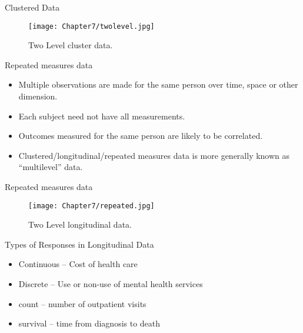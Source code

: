 \documentclass{beamer}
\begin{document}
\begin{frame}{Clustered Data}
\begin{figure}[h!]
\centering
\texttt{[image: Chapter7/twolevel.jpg]}
\caption{Two Level cluster data. \label{twolevel}}
\end{figure}
\end{frame}

\begin{frame}{Repeated measures data}
\begin{itemize}
	\item Multiple observations are made for the same person over time, space or other dimension. \vspace{0.25cm}
	\item Each subject need not have all measurements. \vspace{0.25cm}
	\item Outcomes measured for the same person are likely to be correlated. \vspace{0.25cm}
	\item Clustered/longitudinal/repeated measures data is more generally known as “multilevel” data.
\end{itemize}
\end{frame}

\begin{frame}{Repeated measures data}
\begin{figure}[h!]
\centering
\texttt{[image: Chapter7/repeated.jpg]}
\caption{Two Level longitudinal data. \label{repeated}}
\end{figure}
\end{frame}

\begin{frame}{Types of Responses in Longitudinal Data}
\begin{itemize}
	\item Continuous – Cost of health care
	\item Discrete – Use or non-use of mental health services
	\item count – number of outpatient visits
	\item survival – time from diagnosis to death 
\end{itemize}
\end{frame}
\end{document}
